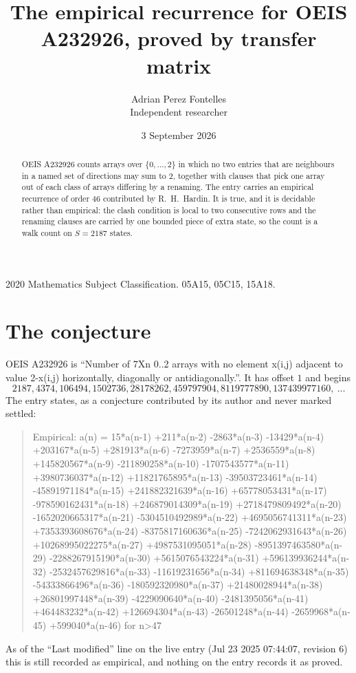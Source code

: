 \documentclass[11pt,a4paper]{article}
\title{The empirical recurrence for OEIS A232926, proved by transfer matrix}
\author{Adrian Perez Fontelles\\ \small Independent researcher}
\date{3 September 2026}
\theoremstyle{plain}
\theoremstyle{definition}
\begin{document}
\maketitle

\begin{abstract}
OEIS A232926 counts arrays over $\{0,\dots,2\}$ in which no two entries that are neighbours in
a named set of directions may sum to $2$, together with clauses that pick one array out of
each class of arrays differing by a renaming. The entry carries an empirical recurrence of
order $46$ contributed by R.~H.~Hardin. It is true, and it is decidable rather than
empirical: the clash condition is local to two consecutive rows and the renaming clauses are
carried by one bounded piece of extra state, so the count is a walk count on $S=2187$ states.
\end{abstract}

\noindent\small 2020 Mathematics Subject Classification. 05A15, 05C15, 15A18.\normalsize

\section{The conjecture}

OEIS A232926 is ``Number of 7Xn 0..2 arrays with no element x(i,j) adjacent to value 2-x(i,j) horizontally, diagonally or antidiagonally.''. It has offset $1$ and begins
\[
2187, 4374, 106494, 1502736, 28178262, 459797904, 8119777890, 137439977160,\ \dots
\]
The entry states, as a conjecture contributed by its author and never marked settled:
\begin{quote}
Empirical: a(n) = 15*a(n-1) +211*a(n-2) -2863*a(n-3) -13429*a(n-4) +203167*a(n-5) +281913*a(n-6) -7273959*a(n-7) +2536559*a(n-8) +145820567*a(n-9) -211890258*a(n-10) -1707543577*a(n-11) +3980736037*a(n-12) +11821765895*a(n-13) -39503723461*a(n-14) -45891971184*a(n-15) +241882321639*a(n-16) +65778053431*a(n-17) -978590162431*a(n-18) +246879014309*a(n-19) +2718479809492*a(n-20) -1652020665317*a(n-21) -5304510492989*a(n-22) +4695056741311*a(n-23) +7353393608676*a(n-24) -8375817160636*a(n-25) -7242062931643*a(n-26) +10268995022275*a(n-27) +4987531095051*a(n-28) -8951397463580*a(n-29) -2288267915190*a(n-30) +5615076543224*a(n-31) +596139936244*a(n-32) -2532457629816*a(n-33) -11619231656*a(n-34) +811694638348*a(n-35) -54333866496*a(n-36) -180592320980*a(n-37) +21480028944*a(n-38) +26801997448*a(n-39) -4229090640*a(n-40) -2481395056*a(n-41) +464483232*a(n-42) +126694304*a(n-43) -26501248*a(n-44) -2659968*a(n-45) +599040*a(n-46) for n>47
\end{quote}
As of the ``Last modified'' line on the live entry (Jul 23 2025 07:44:07, revision 6) this is still
recorded as empirical, and nothing on the entry records it as proved.
\end{document}
